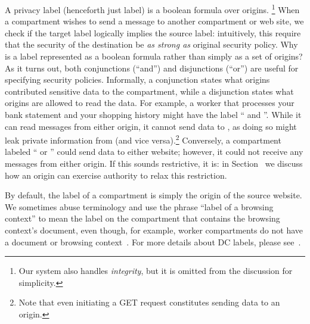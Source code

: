 A privacy label (henceforth just label) is a boolean formula over
origins.%
%
\footnote{
  Our system also handles \emph{integrity}, but it is omitted from
  the discussion for simplicity.
}
%
When a compartment wishes to send a message to another compartment or
web site, we check if the target label logically implies the source
label: intuitively, this require that the security of the destination be
\emph{as strong as} original security policy.
%
Why is a label represented as a boolean formula rather than simply
as a set of origins?
%
As it turns out, both conjunctions (``and'')
and disjunctions (``or'') are useful for specifying security policies.
%
Informally, a conjunction states what origins contributed sensitive data
to the compartment, while a disjunction states what origins are allowed
to read the data.
%
For example, a worker that processes your bank statement and your shopping
history might have the label `` and ''.
%
While it can read messages from either origin, it cannot send data to
, as doing so might leak private information from
 (and vice versa).\footnote{Note that even initiating a
GET request constitutes sending data to an origin.}
%
Conversely, a compartment labeled `` or ''
could send data to either website; however, it could not receive any
messages from either origin.
%
If this sounds restrictive, it is: in Section~ we discuss how
an origin can exercise authority to relax this restriction.
%

By default, the label of a compartment is simply the origin of the
source website.
%
We sometimes abuse terminology and use the phrase  ``label of a browsing
context'' to mean the label on the compartment that contains the
browsing context's document, even though, for example, worker
compartments do not have a document or browsing context~\cite{workers}.
%
For more details about DC labels, please see~\cite{stefan:2011:dclabels}.

